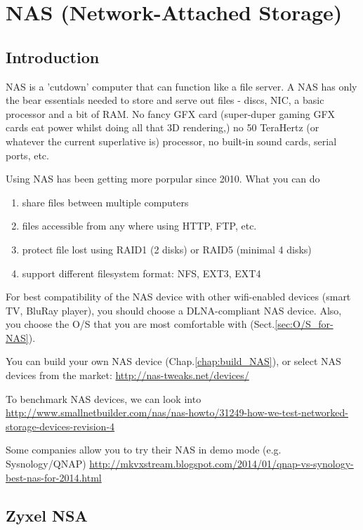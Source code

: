 \chapter{NAS (Network-Attached Storage)}
\label{chap:NAS}

\section{Introduction}

NAS is a 'cutdown' computer that can function like a file server.
A NAS has only the bear essentials needed to store and serve out files - discs,
NIC, a basic processor and a bit of RAM. No fancy GFX card (super-duper gaming
GFX cards eat power whilst doing all that 3D rendering,) no 50 TeraHertz (or
whatever the current superlative is) processor, no built-in sound cards, serial
ports, etc.


Using NAS has been getting more porpular since 2010. What you can do
\begin{enumerate}
  \item share files between multiple computers
  \item files accessible from any where using HTTP, FTP, etc.
  \item protect file lost using RAID1 (2 disks) or RAID5 (minimal 4 disks)
  \item support different filesystem format: NFS, EXT3, EXT4
\end{enumerate}

For best compatibility of the NAS device with other wifi-enabled devices (smart
TV, BluRay player), you should choose a DLNA-compliant NAS device. Also, you
choose the O/S that you are most comfortable with (Sect.\ref{sec:O/S_for-NAS}).


You can build your own NAS device (Chap.\ref{chap:build_NAS}), or select NAS devices from the market: \url{http://nas-tweaks.net/devices/}

To benchmark NAS devices, we can look into
\url{http://www.smallnetbuilder.com/nas/nas-howto/31249-how-we-test-networked-storage-devices-revision-4}

Some companies allow you to try their NAS in demo mode (e.g. Sysnology/QNAP)
\url{http://mkvxstream.blogspot.com/2014/01/qnap-vs-synology-best-nas-for-2014.html}

\section{Zyxel NSA}
\label{sec:Zyxel_NAS}


